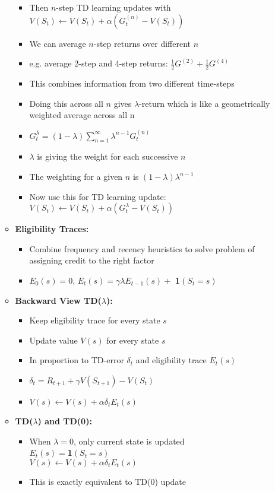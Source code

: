 \documentclass[12pt]{article}
\begin{document}
\begin{itemize}
\begin{itemize}
\begin{itemize}
        \item Then $n$-step TD learning updates with $V(S_t) \leftarrow V(S_t) + \alpha(G^{(n)}_t - V(S_t))$
        \item We can average $n$-step returns over different $n$
        \item e.g. average 2-step and 4-step returns: $\frac{1}{2}G^{(2)} + \frac{1}{2}G^{(4)}$
        \item This combines information from two different time-steps
        \item Doing this across all $n$ gives $\lambda$-return which is like a geometrically weighted average
        across all n
        \item $G^{\lambda}_t = (1 - \lambda)\sum_{n = 1}^{\infty}\lambda^{n-1}G^{(n)}_t$
        \item $\lambda$ is giving the weight for each successive $n$
        \item The weighting for a given $n$ is $(1-\lambda)\lambda^{n-1}$
        \item Now use this for TD learning update: $V(S_t) \leftarrow V(S_t) + \alpha(G_t^\lambda - V(S_t))$
      \end{itemize}
      \item \textbf{Eligibility Traces:}
      \begin{itemize}
        \item Combine frequency and recency heuristics to solve problem of assigning
        credit to the right factor
        \item $E_0(s) = 0$, $E_t(s) = \gamma \lambda E_{t-1}(s) +$ \textbf{1}$(S_t = s)$
      \end{itemize}
      \item \textbf{Backward View TD($\lambda$):}
      \begin{itemize}
        \item Keep eligibility trace for every state $s$
        \item Update value $V(s)$ for every state $s$
        \item In proportion to TD-error $\delta_t$ and eligibility trace $E_t(s)$
        \item $\delta_t = R_{t+1} + \gamma V(S_{t+1}) - V(S_t)$
        \item $V(s) \leftarrow V(s) + \alpha\delta_tE_t(s)$
      \end{itemize}
      \item \textbf{TD($\lambda$) and TD(0):}
      \begin{itemize}
        \item When $\lambda = 0$, only current state is updated \\
        $E_t(s) = $\textbf{1}$(S_t = s)$ \\
        $V(s) \leftarrow V(s) + \alpha\delta_tE_t(s)$
        \item This is exactly equivalent to TD(0) update

      \end{itemize}
    \end{itemize}
  \end{itemize}
\end{document}
